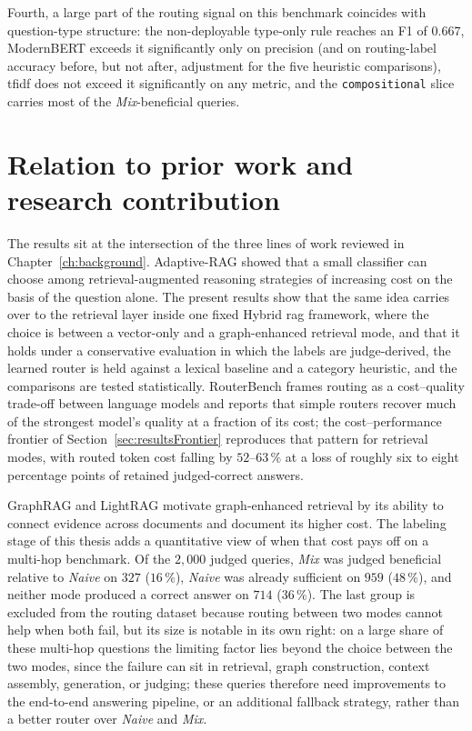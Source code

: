 \documentclass[english, bibtex]{kththesis}               %
\numberwithin{listing}{chapter}
\begin{document}
Fourth, a large part of the routing signal on this benchmark coincides with question-type structure: the non-deployable type-only rule reaches an F1 of $0.667$, ModernBERT exceeds it significantly only on precision (and on routing-label accuracy before, but not after, adjustment for the five heuristic comparisons), \gls{tfidf} does not exceed it significantly on any metric, and the \texttt{compositional} slice carries most of the \emph{Mix}-beneficial queries.

\section{Relation to prior work and research contribution}
\label{sec:discPriorWork}

The results sit at the intersection of the three lines of work reviewed in Chapter~\ref{ch:background}. Adaptive-RAG \cite{jeong2024adaptiverag} showed that a small classifier can choose among retrieval-augmented reasoning strategies of increasing cost on the basis of the question alone. The present results show that the same idea carries over to the retrieval layer inside one fixed Hybrid \gls{rag} framework, where the choice is between a vector-only and a graph-enhanced retrieval mode, and that it holds under a conservative evaluation in which the labels are judge-derived, the learned router is held against a lexical baseline and a category heuristic, and the comparisons are tested statistically. RouterBench \cite{hu2024routerbench} frames routing as a cost--quality trade-off between language models and reports that simple routers recover much of the strongest model's quality at a fraction of its cost; the cost--performance frontier of Section~\ref{sec:resultsFrontier} reproduces that pattern for retrieval modes, with routed token cost falling by $52$--$63\,\%$ at a loss of roughly six to eight percentage points of retained judged-correct answers.

GraphRAG and LightRAG \cite{edge2024graphrag,lightrag2024} motivate graph-enhanced retrieval by its ability to connect evidence across documents and document its higher cost. The labeling stage of this thesis adds a quantitative view of when that cost pays off on a multi-hop benchmark. Of the $2{,}000$ judged queries, \emph{Mix} was judged beneficial relative to \emph{Naive} on $327$ ($16\,\%$), \emph{Naive} was already sufficient on $959$ ($48\,\%$), and neither mode produced a correct answer on $714$ ($36\,\%$). The last group is excluded from the routing dataset because routing between two modes cannot help when both fail, but its size is notable in its own right: on a large share of these multi-hop questions the limiting factor lies beyond the choice between the two modes, since the failure can sit in retrieval, graph construction, context assembly, generation, or judging; these queries therefore need improvements to the end-to-end answering pipeline, or an additional fallback strategy, rather than a better router over \emph{Naive} and \emph{Mix}.
\end{document}
